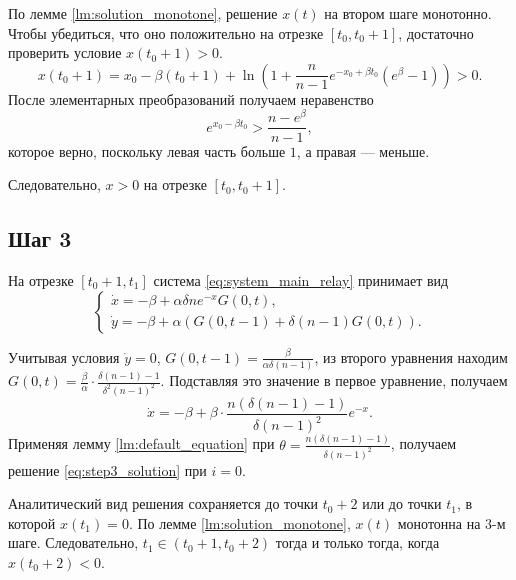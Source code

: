 По лемме \ref{lm:solution_monotone}, решение $x(t)$ на втором шаге монотонно. Чтобы убедиться, что оно положительно на отрезке $[t_0, t_0 + 1]$, достаточно проверить условие $x(t_0 + 1) > 0$.
%
\[
x(t_0 + 1) = x_0 - \beta (t_0 + 1) + \ln\left(1 + \frac{n}{n - 1}e^{-x_0 + \beta t_0} (e^{\beta} - 1)\right) > 0.
\]
%
После элементарных преобразований получаем неравенство
\[
e^{x_0 - \beta t_0} > \dfrac{n - e^\beta}{n - 1},
\]
которое верно, поскольку левая часть больше $1$, а правая --- меньше.

Следовательно, $x > 0$ на отрезке $[t_0, t_0 + 1]$.

\subsection{Шаг 3}
На отрезке $[t_0 + 1, t_1]$ система \eqref{eq:system_main_relay} принимает вид
\begin{equation}
	\label{eq:system_step3}
	\begin{cases}
		\dot{x} = -\beta + \alpha \delta n e^{-x} G(0, t),\\
		\dot{y} = -\beta + \alpha \left(G(0, t - 1) + \delta (n - 1) G(0, t)\right).
	\end{cases}
\end{equation}

Учитывая условия $\dot{y} = 0$, $G(0, t - 1) = \frac{\beta}{\alpha \delta (n - 1)}$, из второго уравнения находим $G(0, t) = \frac{\beta}{\alpha} \cdot \frac{\delta(n - 1) - 1}{\delta^2 (n - 1)^2}$. Подставляя это значение в первое уравнение, получаем
\[
\dot{x} = -\beta + \beta \cdot \dfrac{n (\delta(n - 1) - 1)}{\delta (n - 1)^2} e^{-x}.
\]
%
Применяя лемму \ref{lm:default_equation} при $\theta = \frac{n (\delta(n - 1) - 1)}{\delta (n - 1)^2}$, получаем решение \eqref{eq:step3_solution} при $i = 0$.

Аналитический вид решения сохраняется до точки $t_0 + 2$ или до точки $t_1$, в которой $x(t_1) = 0$. По лемме \ref{lm:solution_monotone}, $x(t)$ монотонна на 3-м шаге. Следовательно, $t_1 \in (t_0 + 1, t_0 + 2)$ тогда и только тогда, когда $x(t_0 + 2) < 0$.

